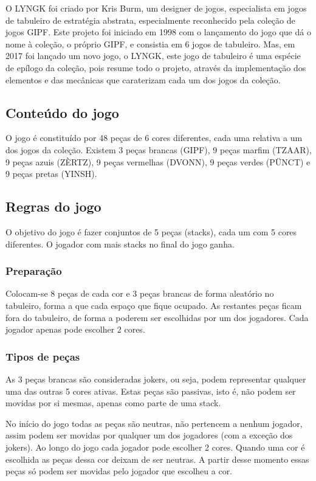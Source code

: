 \documentclass[a4paper]{article}
\begin{document}
O LYNGK foi criado por Kris Burm, um designer de jogos, especialista em jogos de tabuleiro de estratégia abstrata, especialmente reconhecido pela coleção de jogos GIPF. Este projeto foi iniciado em 1998 com o lançamento do jogo que dá o nome à coleção, o próprio GIPF, e consistia em 6 jogos de tabuleiro. Mas, em 2017 foi lançado um novo jogo, o LYNGK, este jogo de tabuleiro é uma espécie de epílogo da coleção, pois resume todo o projeto, através da implementação dos elementos e das mecânicas que caraterizam cada um dos jogos da coleção.

\subsection{Conteúdo do jogo}

O jogo é constituído por 48 peças de 6 cores diferentes, cada uma relativa a um dos jogos da coleção. Existem 3 peças brancas (GIPF), 9 peças marfim (TZAAR), 9 peças azuis (ZÈRTZ), 9 peças vermelhas (DVONN), 9 peças verdes (PÜNCT) e 9 peças pretas (YINSH).

\subsection{Regras do jogo}

O objetivo do jogo é fazer conjuntos de 5 peças (stacks), cada um com 5 cores diferentes. O jogador com mais stacks  no final do jogo ganha.

\subsubsection{Preparação}

Colocam-se 8 peças de cada cor e 3 peças brancas de forma aleatório no tabuleiro, forma a que cada espaço que fique ocupado. As restantes peças ficam fora do tabuleiro, de forma a poderem ser escolhidas por um dos jogadores. Cada jogador apenas pode escolher 2 cores.

\subsubsection{Tipos de peças}

As 3 peças brancas são consideradas jokers, ou seja, podem representar qualquer uma das outras 5 cores ativas. Estas peças são passivas, isto é, não podem ser movidas por si mesmas, apenas como parte de uma stack.

No início do jogo todas as peças são neutras, não pertencem a nenhum jogador, assim podem ser movidas por qualquer um dos jogadores (com a exceção dos jokers). Ao longo do jogo cada jogador pode escolher 2 cores. Quando uma cor é escolhida as peças dessa cor deixam de ser neutras. A partir desse momento essas peças só podem ser movidas pelo jogador que escolheu a cor.
\end{document}
